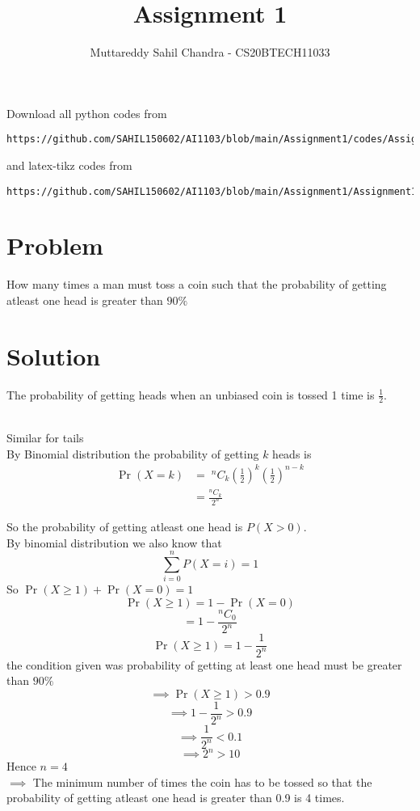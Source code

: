 \documentclass[journal,12pt,twocolumn]{IEEEtran}
\begin{document}
\title{Assignment 1}
\author{Muttareddy Sahil Chandra - CS20BTECH11033}
\maketitle
\newpage
\bigskip
\renewcommand{\thefigure}{\theenumi}
\renewcommand{\thetable}{\theenumi}
Download all python codes from 
\begin{lstlisting}
https://github.com/SAHIL150602/AI1103/blob/main/Assignment1/codes/Assignment.py
\end{lstlisting}
%
and latex-tikz codes from 
%
\begin{lstlisting}
https://github.com/SAHIL150602/AI1103/blob/main/Assignment1/Assignment1.tex
\end{lstlisting}
\section{Problem}
How many times a man must toss a coin such that the probability of getting atleast one head is greater than $90\%$
\section{Solution} 
The probability of getting heads when an unbiased coin is tossed 1 time  is {\large$\frac{1}{2}$}.

  \\ Similar for tails
  \\By Binomial distribution the probability of getting $k$ heads is
  \begin{equation}
      \begin{split}
        \Pr(X = k) & =\;  ^nC_k \left(\frac{1}{2}\right)^k \left(\frac{1}{2}\right)^{n-k}\\   & =\frac{^nC_k}{2^n}  
      \end{split}
  \end{equation}
     
  So the probability of getting atleast one head is $P(X>0) $.\\
  By binomial distribution we also know that 
  \[\sum_{i=0}^{n}P(X=i)=1\]
  So    \;\;\;\;\;\;\;\;\;\;\;\;\;    $\Pr(X\ge 1) + \Pr(X=0)=1$
  $$\Pr(X\ge 1) = 1-\Pr(X=0)$$
  $$= 1-\frac{^nC_0}{2^n}$$
  $$\Pr(X\ge 1) =1- \frac{1}{2^n}$$
  the condition given was probability of getting at least one head must be greater than  $90\%$
  $$\implies  \Pr(X\ge 1)>0.9$$
  $$\implies 1-\frac{1}{2^n}>0.9$$
  $$\implies\frac{1}{2^n}<0.1$$
  $$\implies 2^n>10$$
  Hence $n =4$\\
$\implies$ The minimum number of times the coin has to be tossed so that the probability  of getting atleast one head is greater than 0.9 is 4 times.    
\end{document}
